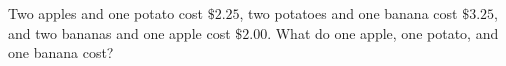 Two apples and one potato cost $\$2.25$, two potatoes and one banana cost $\$3.25$, and two bananas and one apple cost $\$2.00$. What do one apple, one potato, and one banana cost?
